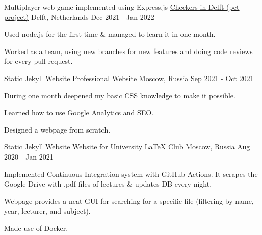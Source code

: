 

\begin{cventries}

  \cventry
    {Multiplayer web game implemented using Express.js}
    {\href{https://github.com/AlexFreik/Checkers-in-Delft}{\underline{Checkers in Delft (pet project)}}} 
    {Delft, Netherlands} %
    {Dec 2021 - Jan 2022} %
    {
      \begin{cvitems} %
        \item {Used node.js for the first time \&
            managed to learn it in one month.}
        \item {Worked as a team, using new branches for new features and doing
            code reviews for every pull request.}
      \end{cvitems}
    }

  \cventry
    {Static Jekyll Website}
    {\href{https://aleksnlp.com/}{\underline{Professional Website}}} 
    {Moscow, Russia} %
    {Sep 2021 - Oct 2021} %
    {
      \begin{cvitems} %
        \item {During one month deepened my basic CSS knowledge 
            to make it possible.}
        \item {Learned how to use Google Analytics and SEO.}
        \item {Designed a webpage from scratch.}
      \end{cvitems}
    }
  \cventry
    {Static Jekyll Website}
    {\href{https://mipt-ltc.github.io/}{\underline{Website for University LaTeX Club}}} 
    {Moscow, Russia} %
    {Aug 2020 - Jan 2021} %
    {
      \begin{cvitems} %
      \item {Implemented Continuous Integration system with GitHub Actions. It scrapes the Google Drive with .pdf files of lectures \& updates DB every night.}
        \item {Webpage provides a neat GUI for searching for a 
            specific file (filtering by name, year, lecturer, and subject).}
        \item {Made use of Docker.}
      \end{cvitems}
    }


\end{cventries}
